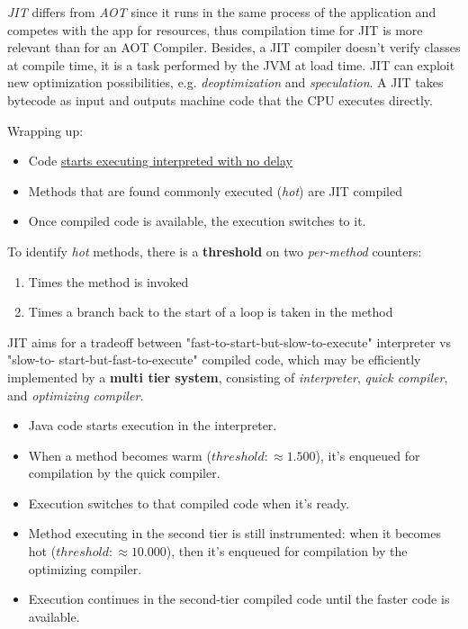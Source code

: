\textit{JIT} differs from \textit{AOT} since it runs in the same process of the application and competes with the app for resources,
thus compilation time for JIT is more relevant than for an AOT Compiler.
Besides, a JIT compiler doesn't verify classes at compile time, it is a task performed by the JVM at load time. 
JIT can exploit new optimization possibilities, e.g. \textit{deoptimization} and \textit{speculation}.
A JIT takes bytecode as input and outputs machine code that the CPU executes directly.\\
{Wrapping up:\ns
\begin{itemize}
    \item Code \ul{starts executing interpreted with no delay}
    \item Methods that are found commonly executed (\textit{hot}) are JIT compiled
    \item Once compiled code is available, the execution switches to it.
\end{itemize}
}
To identify \textit{hot} methods, there is a \textbf{threshold} on two \textit{per-method} counters:
\begin{enumerate}
    \item Times the method is invoked
    \item Times a branch back to the start of a loop is taken in the method
\end{enumerate}

JIT aims for a tradeoff between "fast-to-start-but-slow-to-execute" interpreter vs "slow-to- start-but-fast-to-execute" compiled code, which may be efficiently implemented by a \textbf{multi tier system}, consisting of \textit{interpreter}, \textit{quick compiler}, and \textit{optimizing compiler.}

\begin{itemize}
	\item Java code starts execution in the interpreter.
	\item When a method becomes warm ($threshold: \approx 1.500$), it's
enqueued for compilation by the quick compiler.
	\item Execution switches to that compiled code when it's ready.
	\item Method executing in the second tier is still instrumented:
when it becomes hot ($threshold: \approx 10.000$), then it's
enqueued for compilation by the optimizing compiler.
	\item Execution continues in the second-tier compiled code until
the faster code is available.
\end{itemize}

